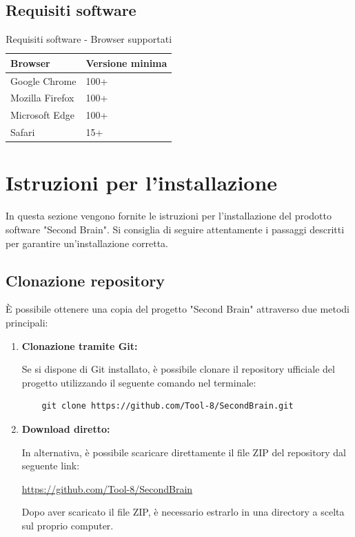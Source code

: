 \documentclass[a4paper,10pt]{article}
\begin{document}
\subsection{Requisiti software}
\begin{table}[H]
\centering
\renewcommand{\arraystretch}{1.3}
\begin{tabular}{|l|l|}
\hline
\textbf{Browser} & \textbf{Versione minima} \\ \hline

Google Chrome & 100+ \\ 
Mozilla Firefox & 100+ \\ 
Microsoft Edge & 100+ \\ 
Safari & 15+ \\ \hline

\end{tabular}
\caption{Requisiti software - Browser supportati}
\end{table}

\section{Istruzioni per l'installazione}
In questa sezione vengono fornite le istruzioni per l'installazione del prodotto software "Second Brain". Si consiglia di seguire attentamente i passaggi descritti per garantire un'installazione corretta.

\subsection{Clonazione repository}
È possibile ottenere una copia del progetto "Second Brain" attraverso due metodi principali:
\begin{enumerate}
  \item \textbf{Clonazione tramite Git:}
  
  Se si dispone di Git installato, è possibile clonare il repository ufficiale del progetto utilizzando il seguente comando nel terminale:

  \begin{lstlisting}
    git clone https://github.com/Tool-8/SecondBrain.git
  \end{lstlisting}
  \item \textbf{Download diretto:}
  
  In alternativa, è possibile scaricare direttamente il file ZIP del repository dal seguente link:

  \begin{center}
    \url{https://github.com/Tool-8/SecondBrain}
  \end{center}

  Dopo aver scaricato il file ZIP, è necessario estrarlo in una directory a scelta sul proprio computer.

\end{enumerate}
\end{document}
